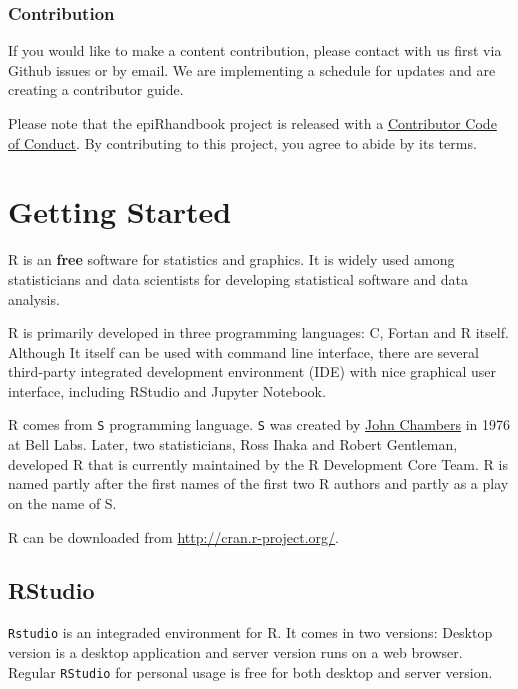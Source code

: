 \documentclass[
]{book}
\begin{document}
\hypertarget{contribution}{%
\subsection*{Contribution}\label{contribution}}

If you would like to make a content contribution, please contact with us first via Github issues or by email. We are implementing a schedule for updates and are creating a contributor guide.

Please note that the epiRhandbook project is released with a \href{https://contributor-covenant.org/version/2/0/CODE_OF_CONDUCT.html}{Contributor Code of Conduct}. By contributing to this project, you agree to abide by its terms.

\hypertarget{getting-started}{%
\chapter{Getting Started}\label{getting-started}}

R is an \textbf{free} software for statistics and graphics. It is widely used among statisticians and data scientists for developing statistical software and data analysis.

R is primarily developed in three programming languages: C, Fortan and R itself. Although It itself can be used with command line interface, there are several third-party integrated development environment (IDE) with nice graphical user interface, including RStudio and Jupyter Notebook.

R comes from \texttt{S} programming language. \texttt{S} was created by \href{https://en.wikipedia.org/wiki/John_Chambers_(programmer)}{John Chambers} in 1976 at Bell Labs. Later, two statisticians, Ross Ihaka and Robert Gentleman, developed R that is currently maintained by the R Development Core Team. R is named partly after the first names of the first two R authors and partly as a play on the name of S.

R can be downloaded from \url{http://cran.r-project.org/}.

\hypertarget{rstudio}{%
\section{RStudio}\label{rstudio}}

\texttt{Rstudio} is an integraded environment for R. It comes in two versions: Desktop version is a desktop application and server version runs on a web browser. Regular \texttt{RStudio} for personal usage is free for both desktop and server version.
\end{document}
